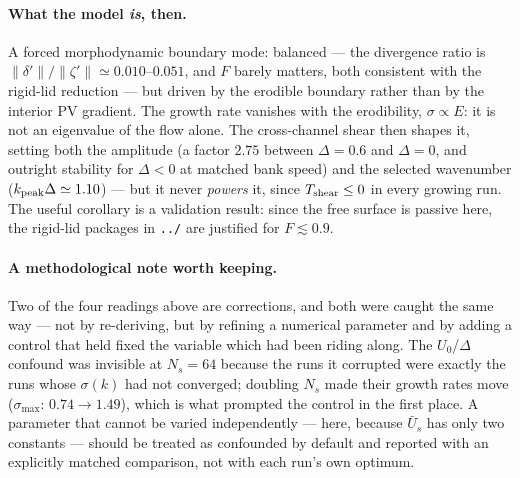 \documentclass[11pt]{article}
\newcommand{\Us}{\bar U_s}
\newcommand{\code}[1]{\texttt{\small #1}}
\begin{document}
\paragraph{What the model \emph{is}, then.} A forced morphodynamic boundary mode:
balanced --- the divergence ratio is $\|\delta'\|/\|\zeta'\|\simeq0.010$--$0.051$, and
$F$ barely matters, both consistent with the rigid-lid reduction --- but driven by the
erodible boundary rather than by the interior PV gradient. The growth rate vanishes with
the erodibility, $\sigma\propto E$: it is not an eigenvalue of the flow alone. The
cross-channel shear then shapes it, setting both the amplitude (a factor $2.75$ between
$\Delta=0.6$ and $\Delta=0$, and outright stability for $\Delta<0$ at matched bank speed)
and the selected wavenumber ($k_{\rm peak}\Delta\simeq1.10$) --- but it never
\emph{powers} it, since $T_{\rm shear}\le0$ in every growing run. The useful corollary is
a validation result: since the free surface is passive here, the rigid-lid packages in
\code{../} are justified for $F\lesssim0.9$.

\paragraph{A methodological note worth keeping.} Two of the four readings above are
corrections, and both were caught the same way --- not by re-deriving, but by refining a
numerical parameter and by adding a control that held fixed the variable which had been
riding along. The $U_0$/$\Delta$ confound was invisible at $N_s=64$ because the runs it
corrupted were exactly the runs whose $\sigma(k)$ had not converged; doubling $N_s$ made
their growth rates move ($\sigma_{\max}$: $0.74\to1.49$), which is what prompted the
control in the first place. A parameter that cannot be varied independently --- here,
because $\Us$ has only two constants --- should be treated as confounded by default and
reported with an explicitly matched comparison, not with each run's own optimum.
\end{document}
